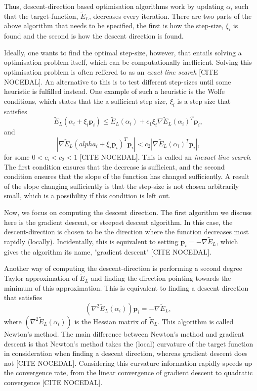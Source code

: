 \documentclass[11pt,a4paper]{article}
\numberwithin{equation}{section}
\begin{document}
Thus, descent-direction based optimisation algorithms work by updating $\alpha_i$ such that the target-function, $\tilde{E}_L$, decreases every iteration. There are two parts of the above algorithm that needs to be specified, the first is how the step-size, $\xi_i$ is found and the second is how the descent direction is found. 

Ideally, one wants to find the optimal step-size, however, that entails solving a optimisation problem itself, which can be computationally inefficient. Solving this optimisation problem is often reffered to as an \emph{exact line search} [CITE NOCEDAL]. An alternative to this is to test different step-sizes until some heuristic is fulfilled instead. One example of such a heuristic is the Wolfe conditions, which states that the a sufficient step size, $\xi_i$ is a step size that satisfies
\begin{equation}
    \tilde{E}_L(\alpha_i + \xi_i \bm{p}_i) \leq \tilde{E}_L(\alpha_i) + c_1\xi_i \nabla \tilde{E}_L(\alpha_i)^T\bm{p}_i,
\end{equation}
and
\begin{equation}
    |\nabla \tilde{E}_L(alpha_i + \xi_i \bm{p}_i)^T\bm{p}_i| < c_2 |\nabla \tilde{E}_L(\alpha_i)^T \bm{p}_i |,
\end{equation}
for some $0 < c_i < c_2 < 1$ [CITE NOCEDAL]. This is called an \emph{inexact line search}. The first condition ensures that the decrease is sufficient, and the second condition ensures that the slope of the function has changed sufficiently. A result of the slope changing sufficiently is that the step-size is not chosen arbitrarily small, which is a possibility if this condition is left out.

Now, we focus on computing the descent direction. The first algorithm we discuss here is the gradient descent, or steepest descent algorithm. In this case, the descent-direction is chosen to be the direction where the function decreases most rapidly (locally). Incidentally, this is equivalent to setting $\bm{p}_i = -\nabla \tilde{E}_L$, which gives the algorithm its name, "gradient descent" [CITE NOCEDAL].

Another way of computing the descent-direction is performing a second degree Taylor approximation of $\tilde{E}_L$ and finding the direction pointing towards the minimum of this approximation. This is equivalent to finding a descent direction that satisfies
\begin{equation}
    (\nabla^2 \tilde{E}_L(\alpha_i))\bm{p}_i = -\nabla \tilde{E}_L,
\end{equation}
where $(\nabla^2 \tilde{E}_L(\alpha_i))$ is the Hessian matrix of $\tilde{E}_L$. This algorithm is called Newton's method. The main difference between Newton's method and gradient descent is that Newton's method takes the (local) curvature of the target function in consideration when finding a descent direction, whereas gradient descent does not [CITE NOCEDAL]. Considering this curvature information rapidly speeds up the convergence rate, from the linear convergence of gradient descent to quadratic convergence [CITE NOCEDAL].
\end{document}
